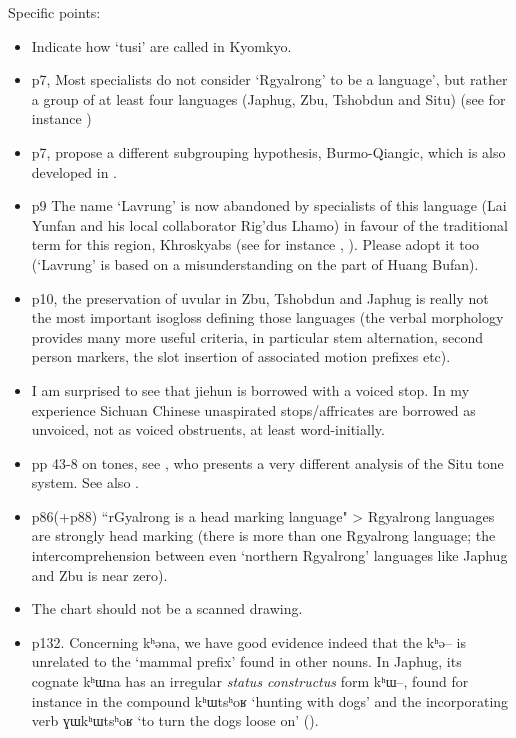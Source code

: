 \documentclass[oldfontcommands,oneside,a4paper,11pt]{article}
\newcommand{\ipa}[1]{{\phon \mbox{#1}}} %
\begin{document}
Specific points:
\begin{itemize}
\item Indicate how `tusi' are called in Kyomkyo.
\item p7, Most specialists do not consider `Rgyalrong' to be a  language', but rather a group of at least four languages (Japhug, Zbu, Tshobdun and Situ) (see for instance \citealt[195]{jacques13harmonization})
\item p7, \citet{jacques.michaud11naish} propose a different subgrouping hypothesis, Burmo-Qiangic, which is also developed in \citet{jacques14esquisse}.
\item p9 The name `Lavrung' is now abandoned by specialists of this language (Lai Yunfan and his local collaborator Rig'dus Lhamo) in favour of the traditional term for this region, Khroskyabs (see for instance \citealt{delancey14second}, \citealt{jacques14inverse}). Please adopt it too (`Lavrung' is based on a misunderstanding on the part of Huang Bufan).
\item p10, the preservation of uvular in Zbu, Tshobdun and Japhug is really not the most important isogloss defining those languages (the verbal morphology provides many more useful criteria, in particular stem alternation, second person markers, the slot insertion of associated motion prefixes etc).
\item I am surprised to see that jiehun is borrowed with a voiced stop. In my experience Sichuan Chinese unaspirated stops/affricates are borrowed as unvoiced, not as voiced obstruents, at least word-initially.
\item pp 43-8 on tones, see \citet{linyj12tone}, who presents a very different analysis of the Situ tone system. See also \citet{jackson05yingao.zh}.
\item p86(+p88) ``rGyalrong is a head marking language" > Rgyalrong languages are strongly head marking (there is more than one Rgyalrong language; the intercomprehension between even `northern Rgyalrong' languages like Japhug and Zbu is near zero).
\item The chart should not be a scanned drawing. 
\item p132.  Concerning \ipa{kʰəna}, we have good evidence indeed that the \ipa{kʰə--} is unrelated to the `mammal prefix' found in other nouns. In Japhug, its cognate \ipa{kʰɯna} has an irregular \textit{status constructus} form \ipa{kʰɯ--}, found for instance in the compound \ipa{kʰɯtsʰoʁ} `hunting with dogs'  and the incorporating verb \ipa{ɣɯkʰɯtsʰoʁ} `to turn the dogs loose on' (\citealt[1214, 1223]{jacques12incorp}).

\end{itemize}
\end{document}
